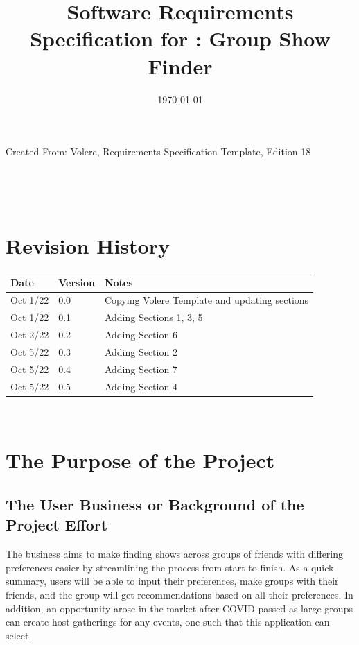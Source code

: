 \documentclass[12pt]{article}
\begin{document}
\title{Software Requirements Specification for \progname: Group Show Finder} 
\author{\authname}
\date{\today}
	
\maketitle
\vspace*{\fill}
Created From: Volere, Requirements Specification Template, Edition 18


~\newpage {}

\tableofcontents

~\newpage

\section*{Revision History}

\begin{tabularx}{\textwidth}{p{3cm}p{2cm}X}
\toprule {\bf Date} & {\bf Version} & {\bf Notes}\\
\midrule
Oct 1/22 & 0.0 & Copying Volere Template and updating sections\\
Oct 1/22 & 0.1 & Adding Sections 1, 3, 5\\
Oct 2/22 & 0.2 & Adding Section 6\\
Oct 5/22 & 0.3 & Adding Section 2\\
Oct 5/22 & 0.4 & Adding Section 7\\
Oct 5/22 & 0.5 & Adding Section 4\\
\bottomrule
\end{tabularx}

~\newpage {}

\section{The Purpose of the Project}

\subsection{The User Business or Background of the Project Effort}
The business aims to make finding shows across groups of friends with differing preferences easier by streamlining the process from start to finish. As a quick summary, users will be able to input their preferences, make groups with their friends, and the group will get recommendations based on all their preferences. In addition, an opportunity arose in the market after COVID passed as large groups can create host gatherings for any events, one such that this application can select.
\end{document}
